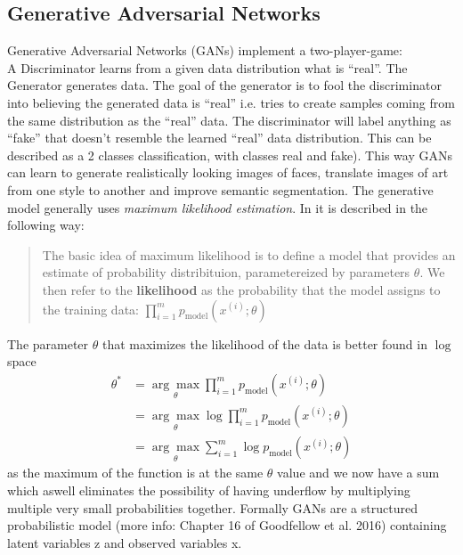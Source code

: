 

\subsection{Generative Adversarial Networks}
Generative Adversarial Networks (GANs) implement a two-player-game:\\
A Discriminator learns from a given data distribution what is ``real''. The Generator generates data. The goal of the generator is to fool the discriminator into believing the generated data is ``real'' i.e. tries to create samples coming from the same distribution as the ``real'' data. The discriminator will label anything as ``fake'' that doesn't resemble the learned ``real'' data distribution. This can be described as a 2 classes classification, with classes real and fake). This way GANs can learn to generate realistically looking images of faces, translate images of art from one style to another and improve semantic segmentation.
The generative model generally uses \textit{maximum likelihood estimation}. In \cite{DBLP:journals/corr/Goodfellow17} it is described in the following way:
\begin{quote}
	The basic idea of maximum likelihood is to define a model that provides an estimate of probability distribituion, parametereized by parameters $\theta$. We then refer to the \textbf{likelihood} as the probability that the model assigns to the training data: $\prod_{i=1}^{m}p_{\text{model}}(x^{(i)}; \theta)$
\end{quote}
The parameter $\theta$ that maximizes the likelihood of the data is better found in $\log$ space
\begin{align}
	\theta^* &= \underset{\theta}{\arg \max} \prod_{i = 1}^{m} p_{\text{model}} (x^{(i)}; \theta)\\
	&= \underset{\theta}{\arg \max} \log \prod_{i=1}^{m} p_{\text{model}}(x^{(i)}; \theta)\\
	&= \underset{\theta}{\arg \max} \sum_{i = 1}^{m} \log p_{\text{model}}(x^{(i)}; \theta)
\end{align}
as the maximum of the function is at the same $\theta$ value and we now have a sum which aswell eliminates the possibility of having underflow by multiplying multiple very small probabilities together.
Formally GANs are a structured probabilistic model (more info: Chapter 16 of Goodfellow et al. 2016) containing latent variables z and observed variables x.
